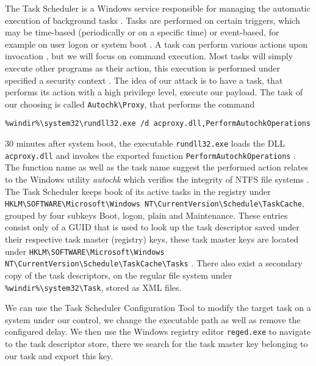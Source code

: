 
The Task Scheduler is a Windows service responsible for managing the automatic execution of background tasks \cite[Section 10]{windows-internals-7-part2}.
Tasks are performed on certain triggers, which may be time-based (periodically or on a specific time) or event-based, for example on user logon or system boot \cite{microsoft-task-scheduler-triggers}.
A task can perform various actions upon invocation \cite{microsoft-task-scheduler-actions}, but we will focus on command execution.
Most tasks will simply execute other programs as their action, this execution is performed under specified a security context \cite{microsoft-task-scheduler-security-contexts}.
The idea of our attack is to have a task, that performs its action with a high privilege level, execute our payload.
The task of our choosing is called \lstinline{Autochk\Proxy}, that performs the command

\begin{lstlisting}
%windir%\system32\rundll32.exe /d acproxy.dll,PerformAutochkOperations
\end{lstlisting}

30 minutes after system boot, the executable \lstinline{rundll32.exe} loads the \ac{DLL} \lstinline{acproxy.dll} and invokes the exported function \lstinline{PerformAutochkOperations} \cite{microsoft-rundll32}.
The function name as well as the task name suggest the performed action relates to the Windows utility \emph{autochk} which verifies the integrity of \ac{NTFS} file systems \cite{microsoft-autochk}.
The Task Scheduler keeps book of its active tasks in the registry under \lstinline{HKLM\SOFTWARE\Microsoft\Windows NT\CurrentVersion\Schedule\TaskCache}, grouped by four subkeys Boot, logon, plain and Maintenance.
These entries consist only of a \ac{GUID} that is used to look up the task descriptor saved under their respective task master (registry) keys, these task master keys are located under \lstinline{HKLM\SOFTWARE\Microsoft\Windows NT\CurrentVersion\Schedule\TaskCache\Tasks} \cite[Section 10]{windows-internals-7-part2}.
There also exist a secondary copy of the task descriptors, on the regular file system under \lstinline{%windir%\system32\Task}, stored as \ac{XML} files.

We can use the Task Scheduler Configuration Tool to modify the target task on a system under our control, we change the executable path as well as remove the configured delay.
We then use the Windows registry editor \lstinline{reged.exe} to navigate to the task descriptor store, there we search for the task master key belonging to our task and export this key.

